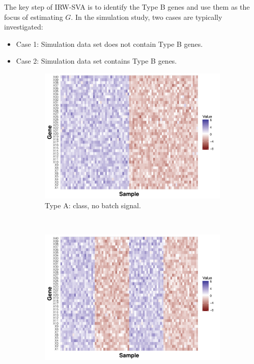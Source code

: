 \documentclass[11pt]{article}
\begin{document}
The key step of IRW-SVA is to identify the Type B genes and use them as the focus of estimating $G$. In the simulation study, two cases are typically investigated:
\begin{itemize}
\item Case 1: Simulation data set does not contain Type B genes.
\item Case 2: Simulation data set contains Type B genes.
\end{itemize}

\begin{figure}[h!]
    \centering
    \begin{subfigure}[t]{0.4\textwidth}
    \includegraphics[width = \textwidth]{figures/Type_A_Gene.pdf}
    \caption{Type A: class, no batch signal.}
    \label{fig:type_a}
    \end{subfigure}
    ~
    \centering
    \begin{subfigure}[t]{0.4\textwidth}
    \includegraphics[width = \textwidth]{figures/Type_B_Gene.pdf}

\end{subfigure}
\end{figure}
\end{document}
